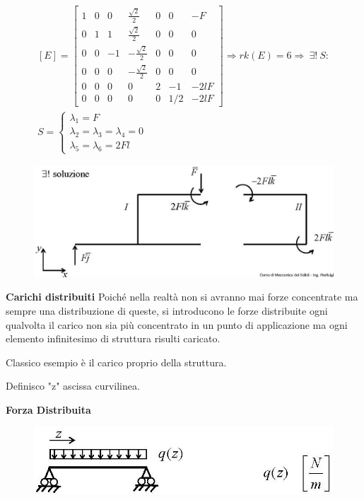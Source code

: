 \documentclass{article}
\begin{document}
\begin{adjustwidth}{2in}{}
\[\begin{array}{c}
[E] = \left[\begin{array}{ccccccc}
	1 & 0 & 0 & \frac{\sqrt{2}}{2} & 0 & 0 & -F \\
	0 & 1 & 1 & \frac{\sqrt{2}}{2} & 0 & 0 & 0 \\
	0 & 0 & -1 & -\frac{\sqrt{2}}{2} & 0 & 0 & 0 \\
	0 & 0 & 0 & -\frac{\sqrt{2}}{2} & 0 & 0 & 0 \\
	0 & 0 & 0 & 0 & 2 & -1 & -2lF \\
	0 & 0 & 0 & 0 & 0 & 1/2 & -2lF
\end{array} \right] \Rightarrow rk(E) = 6 \Rightarrow  ~ \exists! ~  S: \\
S = \begin{cases}
	\lambda_1 = F \\
	\lambda_2 = \lambda_3 = \lambda_4 = 0\\
	\lambda_5 = \lambda_6 = 2Fl
	\end{cases}
\end{array}
\]
\begin{figure}[H]
	\centering
	\includegraphics[width=0.4\linewidth]{immagini/1.PARTE2_Pagina_20}
\end{figure}
\newpage
	{\Large \textbf{Carichi distribuiti}} \mbox{} \newline
	Poiché nella realtà non si avranno mai forze concentrate ma sempre una distribuzione di queste, si introducono le forze distribuite ogni qualvolta il carico non sia più concentrato in un punto di applicazione ma ogni elemento infinitesimo di struttura risulti caricato. 
	
	Classico esempio è il carico proprio della struttura. \newline
	
	Definisco "z" ascissa curvilinea.\newline 
	
	\textbf{Forza Distribuita}		
		
		\begin{figure}[H]
			\centering
			\includegraphics[width=0.4\linewidth]{immagini/1.PARTE2_Pagina_21 (2)}
		\end{figure}
		

\end{adjustwidth}
\end{document}
